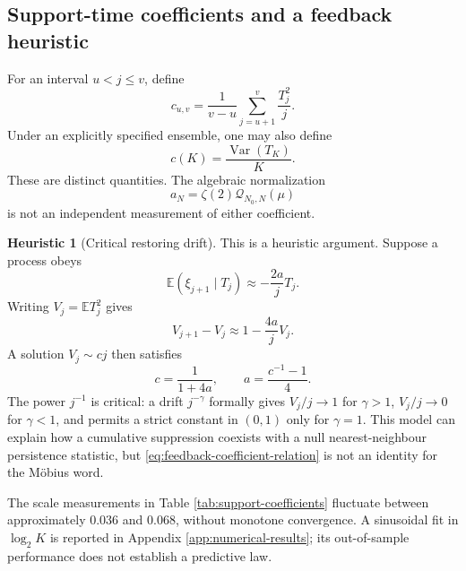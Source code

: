 \documentclass[11pt,reqno]{amsart}
\numberwithin{equation}{section}
\theoremstyle{plain}
\theoremstyle{definition}
\newtheorem{heuristic}[theorem]{Heuristic}
\theoremstyle{remark}
\newcommand{\E}{\mathbb E}
\newcommand{\Var}{\operatorname{Var}}
\newcommand{\QF}{\mathcal Q}
\begin{document}
\subsection{Support-time coefficients and a feedback heuristic}
\label{subsec:support-time-coefficients}

For an interval \(u<j\leq v\), define
\begin{equation}
c_{u,v}=\frac{1}{v-u}\sum_{j=u+1}^{v}\frac{T_j^2}{j}.
\label{eq:local-support-coefficient}
\end{equation}
Under an explicitly specified ensemble, one may also define
\begin{equation}
c(K)=\frac{\Var(T_K)}{K}.
\label{eq:variance-scale-coefficient}
\end{equation}
These are distinct quantities.  The algebraic normalization
\begin{equation}
a_N=\zeta(2)\QF_{N_0,N}(\mu)
\label{eq:density-normalized-quadratic-mass}
\end{equation}
is not an independent measurement of either coefficient.

\begin{heuristic}[Critical restoring drift]
\label{heur:critical-restoring-drift}
This is a heuristic argument.  Suppose a process obeys
\begin{equation}
\E(\xi_{j+1}\mid T_j)\approx-\frac{2a}{j}T_j.
\label{eq:critical-restoring-drift}
\end{equation}
Writing \(V_j=\E T_j^2\) gives
\begin{equation}
V_{j+1}-V_j\approx1-\frac{4a}{j}V_j.
\label{eq:variance-feedback-recursion}
\end{equation}
A solution \(V_j\sim cj\) then satisfies
\begin{equation}
c=\frac{1}{1+4a},\qquad a=\frac{c^{-1}-1}{4}.
\label{eq:feedback-coefficient-relation}
\end{equation}
The power \(j^{-1}\) is critical: a drift \(j^{-\gamma}\) formally gives
\(V_j/j\to1\) for \(\gamma>1\), \(V_j/j\to0\) for \(\gamma<1\), and permits a
strict constant in \((0,1)\) only for \(\gamma=1\).  This model can explain
how a cumulative suppression coexists with a null nearest-neighbour
persistence statistic, but \eqref{eq:feedback-coefficient-relation} is not an
identity for the M\"obius word.
\end{heuristic}

The scale measurements in Table \ref{tab:support-coefficients} fluctuate
between approximately \(0.036\) and \(0.068\), without monotone convergence.
A sinusoidal fit in \(\log_2K\) is reported in Appendix
\ref{app:numerical-results}; its out-of-sample performance does not establish
a predictive law.
\end{document}
